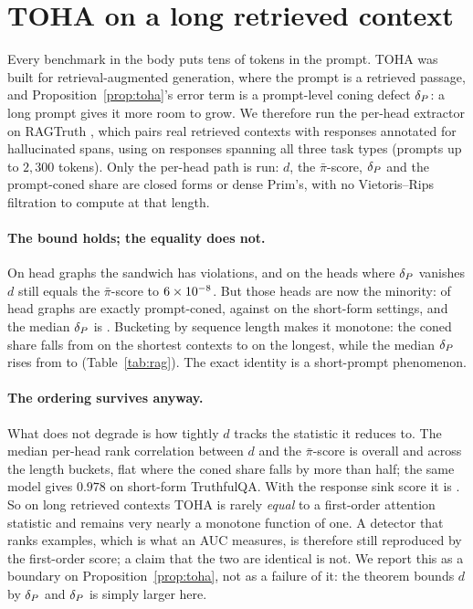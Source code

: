 \section{TOHA on a long retrieved context}
\label{app:rag}

Every benchmark in the body puts tens of tokens in the prompt. TOHA was built for retrieval-augmented generation, where the prompt is a retrieved passage, and Proposition~\ref{prop:toha}'s error term is a prompt-level coning defect $\delta_P$: a long prompt gives it more room to grow. We therefore run the per-head extractor on RAGTruth \citep{ragtruth}, which pairs real retrieved contexts with responses annotated for hallucinated spans, using \RagModel{} on \RagExamples{} responses spanning all three task types (prompts up to $2{,}300$ tokens). Only the per-head path is run: $d$, the $\bar\pi$-score, $\delta_P$ and the prompt-coned share are closed forms or dense Prim's, with no Vietoris--Rips filtration to compute at that length.

\paragraph{The bound holds; the equality does not.} On \RagCells{} head graphs the sandwich has \RagViol{} violations, and on the heads where $\delta_P$ vanishes $d$ still equals the $\bar\pi$-score to $6\times10^{-8}{}$. But those heads are now the minority: \RagConed{} of head graphs are exactly prompt-coned, against \TohaConedRange{} on the short-form settings, and the median $\delta_P$ is \RagMedDefect{}. Bucketing by sequence length makes it monotone: the coned share falls from \RagConedHi{} on the shortest contexts to \RagConedLo{} on the longest, while the median $\delta_P$ rises from \RagDefectLo{} to \RagDefectHi{} (Table~\ref{tab:rag}). The exact identity is a short-prompt phenomenon.

\paragraph{The ordering survives anyway.} What does not degrade is how tightly $d$ tracks the statistic it reduces to. The median per-head rank correlation between $d$ and the $\bar\pi$-score is \RagRhoMaxp{} overall and \RagRhoRange{} across the \RagNBuckets{} length buckets, flat where the coned share falls by more than half; the same model gives $0.978$ on short-form TruthfulQA. With the response sink score it is \RagRhoSink{}. So on long retrieved contexts TOHA is rarely \emph{equal} to a first-order attention statistic and remains very nearly a monotone function of one. A detector that ranks examples, which is what an AUC measures, is therefore still reproduced by the first-order score; a claim that the two are identical is not. We report this as a boundary on Proposition~\ref{prop:toha}, not as a failure of it: the theorem bounds $d$ by $\delta_P$ and $\delta_P$ is simply larger here.

